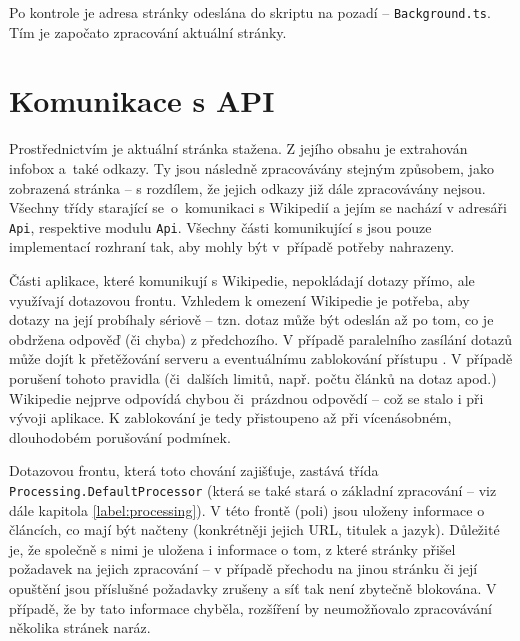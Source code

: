 Po kontrole je adresa stránky odeslána do skriptu na pozadí -- \texttt{Background.ts}. Tím je započato zpracování aktuální stránky.

\section{Komunikace s API}
Prostřednictvím  je aktuální stránka stažena. Z jejího obsahu je extrahován infobox a~také odkazy. Ty jsou následně zpracovávány stejným způsobem, jako zobrazená stránka -- s rozdílem, že jejich odkazy již dále zpracovávány nejsou. Všechny třídy starající se~o~komunikaci s Wikipedií a jejím  se nachází v adresáři \texttt{Api}, respektive modulu \texttt{Api}. Všechny části komunikující s  jsou pouze implementací rozhraní tak, aby mohly být v~případě potřeby nahrazeny. 

Části aplikace, které komunikují s  Wikipedie, nepokládají dotazy přímo, ale využívají dotazovou frontu. Vzhledem k omezení Wikipedie je potřeba, aby dotazy na její  probíhaly sériově -- tzn. dotaz může být odeslán až po tom, co je obdržena odpověď (či chyba) z předchozího. V případě paralelního zasílání dotazů může dojít k přetěžování serveru a eventuálnímu zablokování přístupu \cite{serialquery}. V případě porušení tohoto pravidla (či~dalších limitů, např. počtu článků na dotaz apod.) Wikipedie nejprve odpovídá chybou či~prázdnou odpovědí -- což se stalo i při vývoji aplikace. K zablokování je tedy přistoupeno až při vícenásobném, dlouhodobém porušování podmínek.

Dotazovou frontu, která toto chování zajišťuje, zastává třída \texttt{Pro\-ce\-ss\-ing.De\-fault\-Pro\-ce\-ssor} (která se také stará o základní zpracování -- viz dále kapitola \ref{label:processing}). V této frontě (poli) jsou uloženy informace o článcích, co mají být načteny (konkrétněji jejich URL, titulek a jazyk). Důležité je, že společně s nimi je uložena i informace o tom, z které stránky přišel požadavek na jejich zpracování -- v případě přechodu na jinou stránku či její opuštění jsou příslušné požadavky zrušeny a síť tak není zbytečně blokována. V případě, že by tato informace chyběla, rozšíření by neumožňovalo zpracovávání několika stránek naráz.


